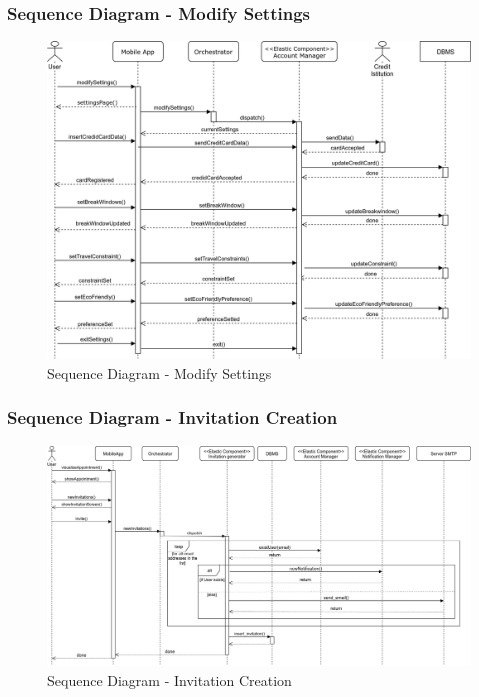 	\subsubsection{Sequence Diagram - Modify Settings}
	\begin{figure}[H]
		\centerline{\includegraphics[width=0.9\paperwidth]{Images/ModifySettings}}
		\caption{Sequence Diagram - Modify Settings}
	\end{figure}

	\subsubsection{Sequence Diagram - Invitation Creation}
		\begin{figure}[H]
			\centerline{\includegraphics[width=0.9\paperwidth]{Images/SD_InvitationCreation}}
			\caption{Sequence Diagram - Invitation Creation}
		\end{figure}
